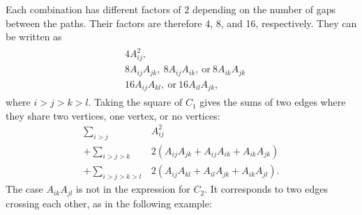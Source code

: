 \documentclass[english,master]{liumaiex}
\theoremstyle{thesisplain}
\theoremstyle{thesisdefinition}
\numberwithin{equation}{section}
\newcommand{\dotposition}[1]{
    ({360/\n * (#1) + 90}:\radius)
}
\begin{document}
\begin{center}
\end{center}
Each combination has different factors of $2$ depending on the number of gaps between the paths. Their factors are therefore 4, 8, and 16, respectively. They can be written as
\begin{align}
\begin{aligned}
	&4 A_{ij}^2, \\
	&8 A_{ij} A_{jk}, \: 8 A_{ij} A_{ik}, \: \text{or} \: 8 A_{ik} A_{jk} \\
	&16 A_{ij} A_{kl}, \: \text{or} \: 16 A_{il} A_{jk},
\end{aligned}
\end{align}
where $i>j>k>l$. Taking the square of $C_1$ gives the sums of two edges where they share two vertices, one vertex, or no vertices:
\begin{equation} \label{eq:C2Sum}
\begin{aligned}
	\sum_{i > j} &A_{ij}^2 \\
	+ \sum_{i > j > k} &2 (A_{ij} A_{jk} + A_{ij} A_{ik} + A_{ik} A_{jk})\\
	+ \sum_{i > j > k > l} &2 (A_{ij} A_{kl} + A_{il} A_{jk} + A_{ik} A_{jl}).
\end{aligned}
\end{equation}
The case $A_{ik} A_{jl}$ is not in the expression for $C_2$. It corresponds to two edges crossing each other, as in the following example:
\end{document}
